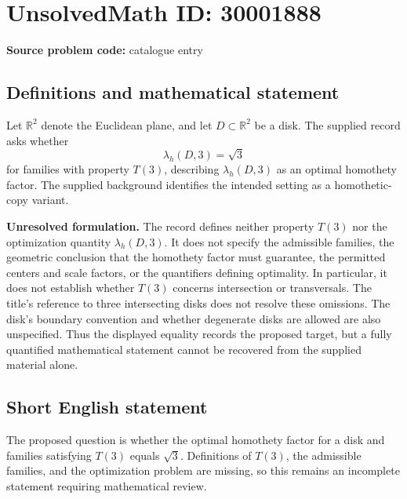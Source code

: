 \documentclass[11pt]{article}
\newcommand{\R}{\mathbb{R}}
\begin{document}
\section*{UnsolvedMath ID: 30001888}
\textbf{Source problem code:} catalogue entry
\subsection{Definitions and mathematical statement}
Let \(\R^2\) denote the Euclidean plane, and let \(D\subset\R^2\) be a disk. The supplied record asks whether
\[
\lambda_h(D,3)=\sqrt{3}
\]
for families with property \(T(3)\), describing \(\lambda_h(D,3)\) as an optimal homothety factor. The supplied background identifies the intended setting as a homothetic-copy variant.

\textbf{Unresolved formulation.} The record defines neither property \(T(3)\) nor the optimization quantity \(\lambda_h(D,3)\). It does not specify the admissible families, the geometric conclusion that the homothety factor must guarantee, the permitted centers and scale factors, or the quantifiers defining optimality. In particular, it does not establish whether \(T(3)\) concerns intersection or transversals. The title's reference to three intersecting disks does not resolve these omissions. The disk's boundary convention and whether degenerate disks are allowed are also unspecified. Thus the displayed equality records the proposed target, but a fully quantified mathematical statement cannot be recovered from the supplied material alone.
\subsection{Short English statement}
The proposed question is whether the optimal homothety factor for a disk and families satisfying \(T(3)\) equals \(\sqrt{3}\). Definitions of \(T(3)\), the admissible families, and the optimization problem are missing, so this remains an incomplete statement requiring mathematical review.
\end{document}
